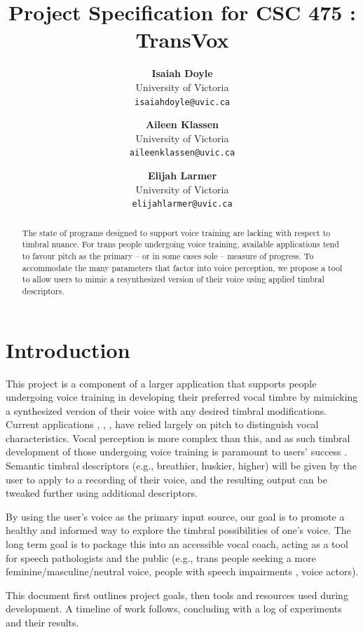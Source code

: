 \documentclass{article}
\title{Project Specification for CSC 475 \conferenceyear: TransVox}
\author{
   \textbf{Isaiah Doyle}\\ {University of Victoria \\\texttt{isaiahdoyle@uvic.ca}}
   \and
   \textbf{Aileen Klassen}\\ {University of Victoria\\\texttt{aileenklassen@uvic.ca}}
   \and
   \textbf{Elijah Larmer}\\ {University of Victoria \\\texttt{elijahlarmer@uvic.ca}}
}
\begin{document}
\maketitle{}


\begin{abstract}
  The state of programs designed to support voice training are lacking with respect to timbral nuance. For trans people undergoing voice training, available applications tend to favour pitch as the primary – or in some cases sole – measure of progress. To accommodate the many parameters that factor into voice perception, we propose a tool to allow users to mimic a resynthesized version of their voice using applied timbral descriptors.
\end{abstract}


\section{Introduction}\label{sec:introduction}

This project is a component of a larger application that supports people undergoing voice training in developing their preferred vocal timbre by mimicking a synthesized version of their voice with any desired timbral modifications. Current applications \cite{DevExtras}, \cite{SeekAndNitz}, \cite{AntoniAndSpeechtools}, \cite{Alter24} have relied largely on pitch to distinguish vocal characteristics. Vocal perception is more complex than this, and as such timbral development of those undergoing voice training is paramount to users’ success \cite{HawleyAndHancock24}. Semantic timbral descriptors (e.g., breathier, huskier, higher) will be given by the user to apply to a recording of their voice, and the resulting output can be tweaked further using additional descriptors.

By using the user’s voice as the primary input source, our goal is to promote a healthy and informed way to explore the timbral possibilities of one’s voice. The long term goal is to package this into an accessible vocal coach, acting as a tool for speech pathologists and the public (e.g., trans people seeking a more feminine/masculine/neutral voice, people with speech impairments \cite{Barkmeier-Kraemer}, voice actors).

This document first outlines project goals, then tools and resources used during development. A timeline of work follows, concluding with a log of experiments and their results.
\end{document}

